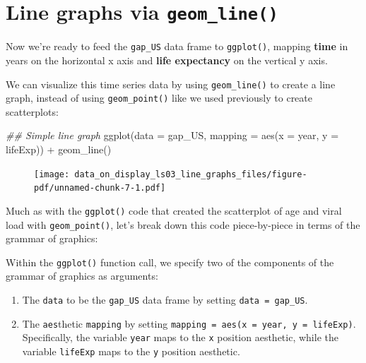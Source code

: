 \documentclass[
  letterpaper,
  DIV=11,
  numbers=noendperiod]{scrreprt}
\newenvironment{Shaded}{\begin{snugshade}}{\end{snugshade}}
\newcommand{\AttributeTok}[1]{\textcolor[rgb]{0.40,0.45,0.13}{#1}}
\newcommand{\DocumentationTok}[1]{\textcolor[rgb]{0.37,0.37,0.37}{\textit{#1}}}
\newcommand{\FunctionTok}[1]{\textcolor[rgb]{0.28,0.35,0.67}{#1}}
\newcommand{\NormalTok}[1]{\textcolor[rgb]{0.00,0.23,0.31}{#1}}
\newcommand{\SpecialCharTok}[1]{\textcolor[rgb]{0.37,0.37,0.37}{#1}}
\providecommand{\tightlist}{%
  \setlength{\itemsep}{0pt}\setlength{\parskip}{0pt}}\usepackage{longtable,booktabs,array}
\begin{document}
\hypertarget{line-graphs-via-geom_line}{%
\section{\texorpdfstring{Line graphs via
\texttt{geom\_line()}}{Line graphs via geom\_line()}}\label{line-graphs-via-geom_line}}

Now we're ready to feed the \texttt{gap\_US} data frame to
\texttt{ggplot()}, mapping \textbf{time} in years on the horizontal x
axis and \textbf{life expectancy} on the vertical y axis.

We can visualize this time series data by using \texttt{geom\_line()} to
create a line graph, instead of using \texttt{geom\_point()} like we
used previously to create scatterplots:

\begin{Shaded}
\begin{Highlighting}[]
\DocumentationTok{\#\# Simple line graph}
\FunctionTok{ggplot}\NormalTok{(}\AttributeTok{data =}\NormalTok{ gap\_US, }
       \AttributeTok{mapping =} \FunctionTok{aes}\NormalTok{(}\AttributeTok{x =}\NormalTok{ year, }
                     \AttributeTok{y =}\NormalTok{ lifeExp)) }\SpecialCharTok{+}
  \FunctionTok{geom\_line}\NormalTok{() }
\end{Highlighting}
\end{Shaded}

\begin{figure}[H]

{\centering \texttt{[image: data\_on\_display\_ls03\_line\_graphs\_files/figure-pdf/unnamed-chunk-7-1.pdf]}

}

\end{figure}

Much as with the \texttt{ggplot()} code that created the scatterplot of
age and viral load with \texttt{geom\_point()}, let's break down this
code piece-by-piece in terms of the grammar of graphics:

Within the \texttt{ggplot()} function call, we specify two of the
components of the grammar of graphics as arguments:

\begin{enumerate}
\def\labelenumi{\arabic{enumi}.}
\tightlist
\item
  The \texttt{data} to be the \texttt{gap\_US} data frame by setting
  \texttt{data\ =\ gap\_US}.
\item
  The \texttt{aes}thetic \texttt{mapping} by setting
  \texttt{mapping\ =\ aes(x\ =\ year,\ y\ =\ lifeExp)}. Specifically,
  the variable \texttt{year} maps to the \texttt{x} position aesthetic,
  while the variable \texttt{lifeExp} maps to the \texttt{y} position
  aesthetic.
\end{enumerate}
\end{document}
